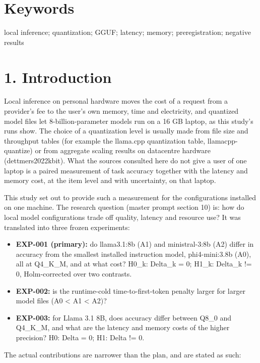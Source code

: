 \documentclass[
]{article}
\providecommand{\tightlist}{%
  \setlength{\itemsep}{0pt}\setlength{\parskip}{0pt}}
\begin{document}
\section{Keywords}\label{keywords}

local inference; quantization; GGUF; latency; memory; preregistration;
negative results

\section{1. Introduction}\label{introduction}

Local inference on personal hardware moves the cost of a request from a
provider's fee to the user's own memory, time and electricity, and
quantized model files let 8-billion-parameter models run on a 16 GB
laptop, as this study's runs show. The choice of a quantization level is
usually made from file size and throughput tables (for example the
llama.cpp quantization table, llamacpp-quantize) or from aggregate
scaling results on datacentre hardware (dettmers2022kbit). What the
sources consulted here do not give a user of one laptop is a paired
measurement of task accuracy together with the latency and memory cost,
at the item level and with uncertainty, on that laptop.

This study set out to provide such a measurement for the configurations
installed on one machine. The research question (master prompt section
10) is: how do local model configurations trade off quality, latency and
resource use? It was translated into three frozen experiments:

\begin{itemize}
\tightlist
\item
  \textbf{EXP-001 (primary):} do llama3.1:8b (A1) and ministral-3:8b
  (A2) differ in accuracy from the smallest installed instruction model,
  phi4-mini:3.8b (A0), all at Q4\_K\_M, and at what cost? H0\_k:
  Delta\_k = 0; H1\_k: Delta\_k != 0, Holm-corrected over two contrasts.
\item
  \textbf{EXP-002:} is the runtime-cold time-to-first-token penalty
  larger for larger model files (A0 \textless{} A1 \textless{} A2)?
\item
  \textbf{EXP-003:} for Llama 3.1 8B, does accuracy differ between Q8\_0
  and Q4\_K\_M, and what are the latency and memory costs of the higher
  precision? H0: Delta = 0; H1: Delta != 0.
\end{itemize}

The actual contributions are narrower than the plan, and are stated as
such:
\end{document}

